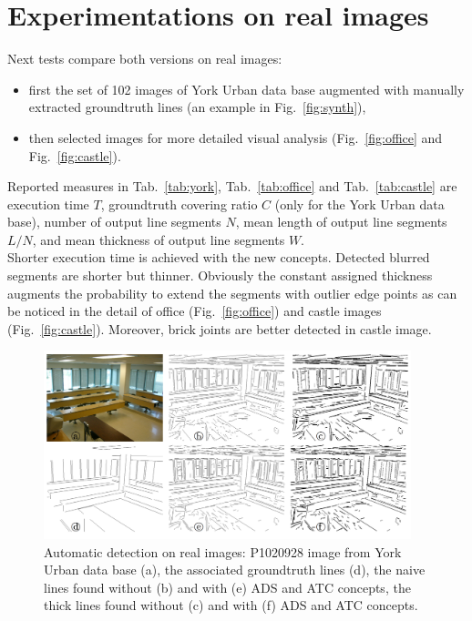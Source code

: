 \documentclass[11pt]{article}
\begin{document}
\pagebreak

\section{Experimentations on real images}

Next tests compare both versions on real images:
\begin{itemize}
\item first the set of 102 images of York Urban data base \cite{Denis08}
augmented with manually extracted groundtruth lines (an example in
Fig.~\ref{fig:synth}),
\item then selected images for more detailed visual analysis
(Fig.~\ref{fig:office} and Fig.~\ref{fig:castle}).
\end{itemize}
Reported measures in Tab.~\ref{tab:york}, Tab.~\ref{tab:office} and
Tab.~\ref{tab:castle}
are execution time $T$, groundtruth covering
ratio $C$ (only for the York Urban data base), number of output line
segments $N$, mean length of output line segments $L/N$, and mean
thickness of output line segments $W$. \\

Shorter execution time is achieved with the new concepts.
Detected blurred segments are shorter but thinner.
Obviously the constant assigned thickness augments the probability to extend
the segments with outlier edge points as can be noticed in the detail of
office (Fig.~\ref{fig:office}) and castle images (Fig.~\ref{fig:castle}).
Moreover, brick joints are better detected in castle image.

\begin{figure}[h]
  \begin{center}
  \includegraphics[width=0.95\textwidth]{Images/expe0.png}
  \end{center}
  \caption{Automatic detection on real images:
    P1020928 image from York Urban data base \cite{Denis08} (a),
    the associated groundtruth lines (d),
    the naive lines found without (b) and with (e) ADS and ATC concepts,
    the thick lines found without (c) and with (f) ADS and ATC concepts.}
  \label{fig:york}
\end{figure}
\end{document}
